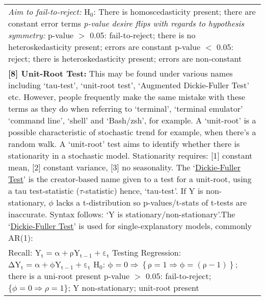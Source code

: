 \documentclass[11pt, english]{article}
\begin{document}
\begin{center}
\begin{longtable}{p{14cm}}
                \textit{Aim to fail-to-reject:}\newline
                H$_0$: There is homoscedasticity present; there are constant error terms\newline\newline
                \textit{p-value desire flips with regards to hypothesis symmetry:}\newline
                p-value $>$ 0.05: fail-to-reject; there is no heteroskedasticity present; errors are constant\newline
                p-value $<$ 0.05: reject; there is heteroskedasticity present; errors are non-constant\\
                \textbf{[8] Unit-Root Test: }This may be found under various names including `tau-test', `unit-root test', `Augmented Dickie-Fuller Test' etc. However, people frequently make the same mistake with these terms as they do when referring to `terminal', `terminal emulator' `command line', `shell' and `Bash/zsh', for example.\newline\newline
                A `unit-root' is a possible characteristic of stochastic trend for example, when there's a random walk. A `unit-root' test aims to identify whether there is stationarity in a stochastic model. Stationarity requires: [1] constant mean, [2] constant variance, [3] no seasonality. The `\underline{Dickie-Fuller Test}' is the creator-based name given to a test for a unit-root, using a tau test-statistic ($\tau$-statistic) hence, `tau-test'. If Y is non-stationary, $\phi$ lacks a t-distribution so p-values/t-stats of t-tests are inaccurate. Syntax follows: `Y is stationary/non-stationary'.\newline\newline
                [8.1] The `\underline{Dickie-Fuller Test}' is used for single-explanatory models, commonly AR(1):\\
                Recall: $\mathrm{Y_t=\alpha+\rho Y_{t-1}+\varepsilon_t}$\newline
                Testing Regression: $\mathrm{\Delta Y_t=\alpha+\phi Y_{t-1}+\varepsilon_t}$\newline\newline
                H$_0$: $\mathrm{\phi=0\Rightarrow\left\{\rho=1\Rightarrow\phi=(\rho-1)\right\}}$; there is a uni-root present\newline\newline
                p-value $>$ 0.05: fail-to-reject; $\{\phi=0\Rightarrow\rho=1\}$; Y non-stationary; unit-root present\newline

\end{longtable}
\end{center}
\end{document}
